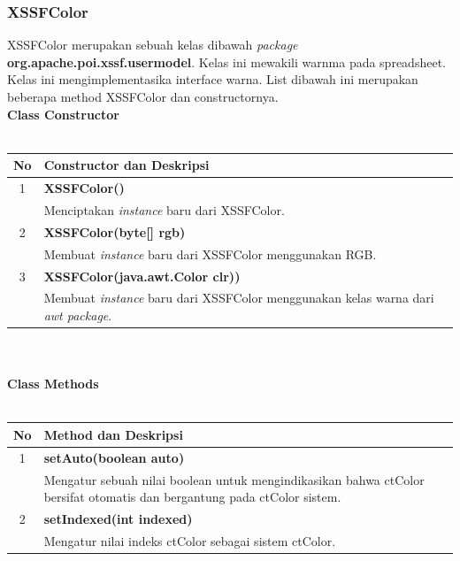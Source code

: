 \subsubsection{XSSFColor}
XSSFColor merupakan sebuah kelas dibawah \textit{package} \textbf{org.apache.poi.xssf.usermodel}. Kelas ini mewakili warnma pada spreadsheet. Kelas ini mengimplementasika interface warna. List dibawah ini merupakan beberapa method XSSFColor dan constructornya.\cite{tutpoint}
\\
\noindent \textbf{Class Constructor}\\ \\
	\begin{tabular}{|c|p{12cm}|}
		\hline
		\textbf{No} & \textbf{Constructor dan Deskripsi} \\ \hline \hline
		1 & \textbf{XSSFColor()}\\
			&	Menciptakan \textit{instance} baru dari XSSFColor.\\ \hline
		2 & \textbf{XSSFColor(byte[] rgb)}\\
			&	Membuat  \textit{instance} baru dari XSSFColor menggunakan RGB.\\ \hline
		3 & \textbf{XSSFColor(java.awt.Color clr))}\\
			&	Membuat  \textit{instance} baru dari XSSFColor menggunakan kelas warna dari \textit{awt package}.\\ \hline 		
	\end{tabular}
\\ \\
\noindent \textbf{Class Methods}\\ \\
	\begin{tabular}{|c|p{12cm}|}
		\hline
		\textbf{No} & \textbf{Method dan Deskripsi} \\ \hline \hline
		1 & \textbf{setAuto(boolean auto)}\\
			&	Mengatur sebuah nilai boolean untuk mengindikasikan bahwa ctColor bersifat otomatis dan bergantung pada ctColor sistem.\\ \hline
		2 & \textbf{setIndexed(int indexed)}\\
			&	Mengatur nilai indeks ctColor sebagai sistem ctColor.\\ \hline
	\end{tabular}

